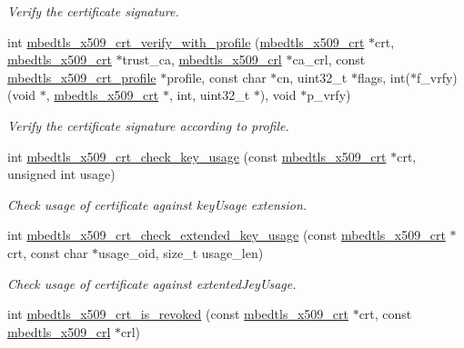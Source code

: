 \begin{DoxyCompactItemize}
\begin{DoxyCompactList}\small\item\em Verify the certificate signature. \end{DoxyCompactList}\item 
int \mbox{\hyperlink{group__x509__module_gaf044a51e5b5bc854bf12aeeccb440e55}{mbedtls\+\_\+x509\+\_\+crt\+\_\+verify\+\_\+with\+\_\+profile}} (\mbox{\hyperlink{structmbedtls__x509__crt}{mbedtls\+\_\+x509\+\_\+crt}} $\ast$crt, \mbox{\hyperlink{structmbedtls__x509__crt}{mbedtls\+\_\+x509\+\_\+crt}} $\ast$trust\+\_\+ca, \mbox{\hyperlink{structmbedtls__x509__crl}{mbedtls\+\_\+x509\+\_\+crl}} $\ast$ca\+\_\+crl, const \mbox{\hyperlink{structmbedtls__x509__crt__profile}{mbedtls\+\_\+x509\+\_\+crt\+\_\+profile}} $\ast$profile, const char $\ast$cn, uint32\+\_\+t $\ast$flags, int($\ast$f\+\_\+vrfy)(void $\ast$, \mbox{\hyperlink{structmbedtls__x509__crt}{mbedtls\+\_\+x509\+\_\+crt}} $\ast$, int, uint32\+\_\+t $\ast$), void $\ast$p\+\_\+vrfy)
\begin{DoxyCompactList}\small\item\em Verify the certificate signature according to profile. \end{DoxyCompactList}\item 
int \mbox{\hyperlink{group__x509__module_ga0ab7857ffd82467207e718bb9f0131a2}{mbedtls\+\_\+x509\+\_\+crt\+\_\+check\+\_\+key\+\_\+usage}} (const \mbox{\hyperlink{structmbedtls__x509__crt}{mbedtls\+\_\+x509\+\_\+crt}} $\ast$crt, unsigned int usage)
\begin{DoxyCompactList}\small\item\em Check usage of certificate against key\+Usage extension. \end{DoxyCompactList}\item 
int \mbox{\hyperlink{group__x509__module_gad21c0e75a3fdbeb1f65e4d339e479df3}{mbedtls\+\_\+x509\+\_\+crt\+\_\+check\+\_\+extended\+\_\+key\+\_\+usage}} (const \mbox{\hyperlink{structmbedtls__x509__crt}{mbedtls\+\_\+x509\+\_\+crt}} $\ast$crt, const char $\ast$usage\+\_\+oid, size\+\_\+t usage\+\_\+len)
\begin{DoxyCompactList}\small\item\em Check usage of certificate against extented\+Jey\+Usage. \end{DoxyCompactList}\item 
int \mbox{\hyperlink{group__x509__module_ga0dc256a70f90cb68002d53bafffab232}{mbedtls\+\_\+x509\+\_\+crt\+\_\+is\+\_\+revoked}} (const \mbox{\hyperlink{structmbedtls__x509__crt}{mbedtls\+\_\+x509\+\_\+crt}} $\ast$crt, const \mbox{\hyperlink{structmbedtls__x509__crl}{mbedtls\+\_\+x509\+\_\+crl}} $\ast$crl)

\end{DoxyCompactItemize}
